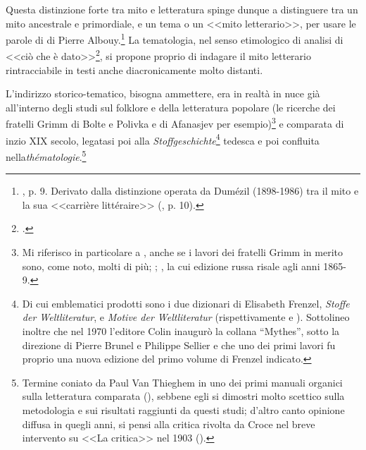\documentclass[12pt,a4paper,openright, oneside]{book}
\begin{document}
Questa distinzione forte tra mito e letteratura spinge dunque a distinguere tra un mito ancestrale e primordiale, e un tema o  un <<mito letterario>>, per usare le parole di di Pierre Albouy.\footnote{\cite{Albouy}, p. 9. Derivato dalla distinzione operata da Dumézil (1898-1986) tra il mito e la sua <<carrière littéraire>> (\cite{Dumezil}, p. 10).} La tematologia, nel senso etimologico di analisi di <<ciò che è dato>>\footnote{\cite{Souiller}.}, si propone proprio di indagare il mito letterario rintracciabile in testi anche diacronicamente molto distanti.

L'indirizzo storico-tematico, bisogna ammettere,  era in realtà in nuce già all'interno degli studi sul folklore e della letteratura popolare (le ricerche dei fratelli Grimm di Bolte e Polivka e di Afanasjev per esempio)\footnote{Mi riferisco in particolare a \cite{Grimm}, anche se i lavori dei fratelli Grimm in merito sono, come noto, molti di più; \cite{Bolte}; \cite{Afanasjev}, la cui edizione russa risale agli anni 1865-9.} e comparata di inzio XIX secolo, legatasi poi alla \textit{Stoffgeschichte}\footnote{Di cui emblematici prodotti sono i due dizionari di Elisabeth Frenzel, \textit{Stoffe der Weltliteratur}, e \textit{Motive der Weltliteratur} (rispettivamente \cite{Frenzel} e \cite{Frenzel1}). Sottolineo inoltre che nel 1970 l'editore Colin inaugurò la collana ``Mythes'', sotto la direzione di Pierre Brunel e Philippe Sellier e che uno dei primi lavori fu proprio una nuova edizione del primo volume di Frenzel indicato.} tedesca e poi confluita nella\textit{thématologie}.\footnote{Termine coniato da Paul Van Thieghem in uno dei primi manuali organici sulla letteratura comparata (\cite{Thiegem}), sebbene egli si dimostri molto scettico sulla metodologia e sui risultati raggiunti da questi studi; d'altro canto opinione diffusa in quegli anni, si pensi alla critica rivolta da Croce nel breve intervento su <<La critica>> nel 1903 (\cite{Croce}).}
\end{document}
